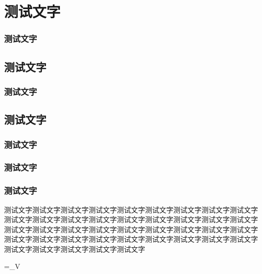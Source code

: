 







\section{测试文字}

\makeatletter
{}
\makeatother
\subsubsection{测试文字}
\lipsum



\subsection{测试文字}
\subsubsection{测试文字}


\subsection{测试文字}
\subsubsection{测试文字}
\subsubsection{测试文字}
\subsubsection{测试文字}

\begin{Example}
	测试文字测试文字测试文字测试文字测试文字测试文字测试文字测试文字测试文字测试文字测试文字测试文字测试文字测试文字测试文字测试文字测试文字测试文字测试文字测试文字测试文字测试文字测试文字测试文字测试文字测试文字测试文字测试文字测试文字测试文字测试文字测试文字测试文字测试文字测试文字测试文字测试文字测试文字测试文字测试文字测试文字
	\begin{flalign}
		\Psi=\int_\Omega{}V
	\end{flalign}
\end{Example}




